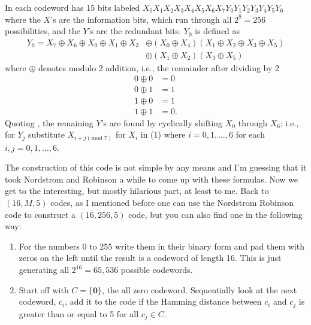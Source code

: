 \documentclass{article}
\theoremstyle{remark}
\begin{document}
	In \cite{NS} each codeword has 15 bits labeled $X_0X_1X_2X_3X_4X_5X_6X_7Y_0Y_1Y_2Y_3Y_4Y_5Y_6$ where the $X$'s are the information bits, which run through all $2^8=256$ possibilities, and the $Y$'s are the redundant bits.  $Y_0$ is defined as
	\begin{align}
		Y_0=X_7\oplus X_6\oplus X_0\oplus X_1\oplus X_3 & \oplus (X_0\oplus X_4)(X_1\oplus X_2\oplus X_3\oplus X_5) \nonumber \\
		& \oplus(X_1\oplus X_2)(X_3\oplus X_5)
	\end{align}
	where $\oplus$ denotes modulo 2 addition, i.e., the remainder after dividing by 2
	\begin{align*}
		0\oplus0 & =0 \\
		0\oplus1 & =1 \\
		1\oplus0 & =1 \\
		1\oplus1 & =0.
	\end{align*}
	Quoting \cite{NS}, the remaining $Y$'s are found by cyclically shifting $X_0$ through $X_6$; i.e., for $Y_j$ substitute $X_{i+j(\text{mod }7)}$ for $X_i$ in (1) where $i=0,1,\dots,6$ for each $i,j=0,1,\dots,6$.
	
	The construction of this code is not simple by any means and I'm guessing that it took Nordstrom and Robinson a while to come up with these formulas.  Now we get to the interesting, but mostly hilarious part, at least to me.  Back to $(16,M,5)$ codes, as I mentioned before one can use the Nordstrom Robinson code to construct a $(16,256,5)$ code, but you can also find one in the following way:
	\begin{enumerate}
		\item For the numbers 0 to 255 write them in their binary form and pad them with zeros on the left until the result is a codeword of length 16.  This is just generating all $2^{16}=65,536$ possible codewords.
		\item Start off with $C=\{\textbf{0}\}$, the all zero codeword.  Sequentially look at the next codeword, $c_i$, add it to the code if the Hamming distance between $c_i$ and $c_j$ is greater than or equal to 5 for all $c_j\in C$.
	\end{enumerate}
\end{document}

